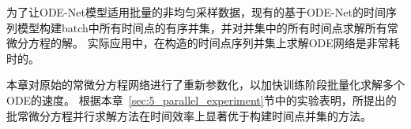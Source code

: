为了让ODE-Net模型适用批量的非均匀采样数据，现有的基于ODE-Net的时间序列模型\cite{yildiz2021continuous,Rubanova2019}构建batch中所有时间点的有序并集，并对并集中的所有时间点求解所有常微分方程的解。
实际应用中，在构造的时间点序列并集上求解ODE网络是非常耗时的。


本章对原始的常微分方程网络进行了重新参数化，以加快训练阶段批量化求解多个ODE的速度。
根据本章~\ref{sec:5_parallel_experiment}节中的实验表明，所提出的批常微分方程并行求解方法在时间效率上显著优于构建时间点并集的方法。


